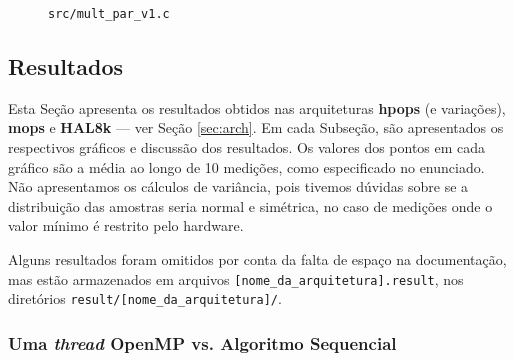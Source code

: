 \documentclass[a4paper, 12pt]{article}
\begin{document}
\begin{figure}[H]
    \centering
    
    \caption{\texttt{src/mult\_par\_v1.c}}
    \label{fig:par_v1}
\end{figure}

\subsection{Resultados} \label{sec:res}

Esta Seção apresenta os resultados obtidos nas arquiteturas \textbf{hpops}
(e variações), \textbf{mops} e \textbf{HAL8k} --- ver Seção \ref{sec:arch}.
Em cada Subseção, são apresentados os respectivos gráficos e discussão dos
resultados. Os valores dos pontos em cada gráfico são a média ao longo de
10 medições, como especificado no enunciado. 
Não apresentamos os cálculos de variância, pois tivemos dúvidas sobre se a 
distribuição das amostras seria normal e simétrica, no caso de medições onde o 
valor mínimo é restrito pelo hardware.

Alguns resultados foram omitidos por conta da falta de espaço na
documentação, mas estão armazenados em arquivos
\texttt{[nome\_da\_arquitetura].result}, nos diretórios
\texttt{result/[nome\_da\_arquitetura]/}.

\subsubsection{Uma \textit{thread} OpenMP vs. Algoritmo Sequencial}
\end{document}
